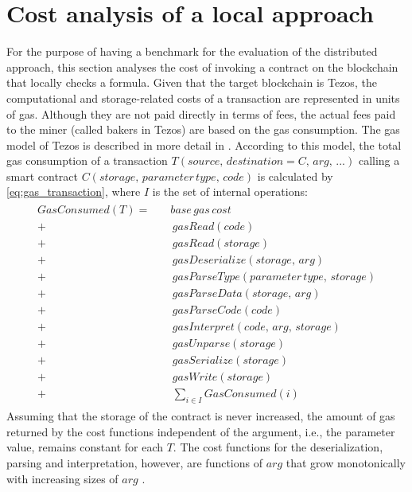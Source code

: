 \section{Cost analysis of a local approach}\label{sec:usecase_cost}
For the purpose of having a benchmark for the evaluation of the distributed approach, this section analyses the cost of invoking a contract on the blockchain that locally checks a formula. Given that the target blockchain is Tezos, the computational and storage-related costs of a transaction are represented in units of gas. Although they are not paid directly in terms of fees, the actual fees paid to the miner (called bakers in Tezos) are based on the gas consumption. The gas model of Tezos is described in more detail in . According to this model, the total gas consumption of a transaction $T(source,\, destination=C,\, arg, \, ...)$ calling a smart contract $C(storage, \, parameter\, type, \, code)$ is calculated by \eqref{eq:gas_transaction}, where $I$ is the set of internal operations:
\begin{align}\label{eq:gas_transaction}
\begin{split}
GasConsumed(T) = \quad &base \, gas \, cost \\
+& \, gasRead(code) \\
+& \, gasRead(storage) \\
+& \, gasDeserialize(storage, \, arg) \\
+& \, gasParseType(parameter \, type, \, storage) \\
+& \, gasParseData(storage, \, arg) \\
+& \, gasParseCode(code) \\
+& \, gasInterpret(code, \, arg, \, storage) \\
+& \, gasUnparse(storage) \\
+& \, gasSerialize(storage) \\
+& \, gasWrite(storage) \\
+& \, \sum_{i \in I} GasConsumed(i)
\end{split}
\end{align}
Assuming that the storage of the contract is never increased, the amount of gas returned by the cost functions independent of the argument, i.e., the parameter value, remains constant for each $T$. The cost functions for the deserialization, parsing and interpretation, however, are functions of $arg$ that grow monotonically with increasing sizes of $arg$ \cite{morley_gasmodel}\cite{tezos_repo}.

